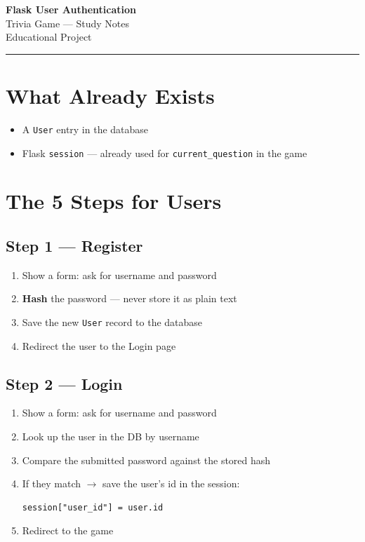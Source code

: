 \documentclass[12pt, a4paper]{article}
\begin{document}
\begin{center}
    {\LARGE \textbf{Flask User Authentication}}\\[0.5em]
    {\large Trivia Game --- Study Notes}\\[0.3em]
    {\small Educational Project}
\end{center}

\vspace{1em}
\hrule
\vspace{1.5em}

\section{What Already Exists}

\begin{itemize}
    \item A \texttt{User} entry in the database
    \item Flask \texttt{session} --- already used for \texttt{current\_question} in the game
\end{itemize}

\section{The 5 Steps for Users}

\subsection{Step 1 --- Register}
\begin{enumerate}
    \item Show a form: ask for username and password
    \item \textbf{Hash} the password --- never store it as plain text
    \item Save the new \texttt{User} record to the database
    \item Redirect the user to the Login page
\end{enumerate}

\subsection{Step 2 --- Login}
\begin{enumerate}
    \item Show a form: ask for username and password
    \item Look up the user in the DB by username
    \item Compare the submitted password against the stored hash
    \item If they match $\rightarrow$ save the user's id in the session:
\begin{lstlisting}
session["user_id"] = user.id
\end{lstlisting}
    \item Redirect to the game
\end{enumerate}
\end{document}

